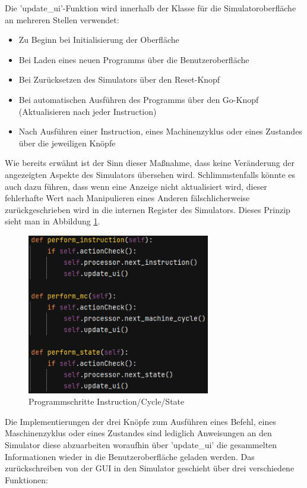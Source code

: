 \documentclass[12pt]{article}
\newcommand{\imgSpaceBefore}{\vspace{10pt}}
\begin{document}
\noindent
Die 'update\_ui'-Funktion wird innerhalb der Klasse für die Simulatoroberfläche an mehreren Stellen verwendet:\imgSpaceBefore

\begin{itemize}
	\item Zu Beginn bei Initialisierung der Oberfläche
	\item Bei Laden eines neuen Programms über die Benutzeroberfläche
	\item Bei Zurücksetzen des Simulators über den Reset-Knopf
	\item Bei automatischen Ausführen des Programms über den Go-Knopf (Aktualisieren nach jeder Instruction)
	\item Nach Ausführen einer Instruction, eines Machinenzyklus oder eines Zustandes über die jeweiligen Knöpfe
\end{itemize}

\noindent
Wie bereits erwähnt ist der Sinn dieser Maßnahme, dass keine Veränderung der angezeigten Aspekte des Simulators übersehen wird. Schlimmstenfalls könnte es auch dazu führen, dass wenn eine Anzeige nicht aktualisiert wird, dieser fehlerhafte Wert nach Manipulieren eines Anderen fälschlicherweise zurückgeschrieben wird in die internen Register des Simulators. Dieses Prinzip sieht man in Abbildung \ref{fig:perf}.\imgSpaceBefore

\begin{figure}[H]
\centering
\includegraphics[width=8cm]{bilder/Perform}
\caption{Programmschritte Instruction/Cycle/State}
\label{fig:perf}
\end{figure}

\noindent
Die Implementierungen der drei Knöpfe zum Ausführen eines Befehl, eines Maschinenzyklus oder eines Zustandes sind lediglich Anweisungen an den Simulator diese abzuarbeiten woraufhin über 'update\_ui' die gesammelten Informationen wieder in die Benutzeroberfläche geladen werden. Das zurückschreiben von der GUI in den Simulator geschieht über drei verschiedene Funktionen:\imgSpaceBefore
\end{document}
